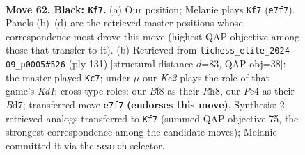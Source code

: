 \documentclass[11pt]{article}
\begin{document}
\begin{figure}[p]\centering
\begin{subfigure}{0.46\textwidth}\centering
\resizebox{\linewidth}{!}{%
\newchessgame
\chessboard[
  setfen={4rb2/4k1p1/p1p4r/Pp1b1p1p/2p2P1P/2B1P1P1/1P1K3N/1R4R1 b - - 26 62},
  showmover=false,
  pgfstyle=straightmove, color=movearrow, markmove={e7-f7}
]}
\caption{}
\end{subfigure}\hfill
\begin{subfigure}{0.46\textwidth}\centering
\resizebox{\linewidth}{!}{%
\newchessgame
\chessboard[
  setfen={2rk3r/3b1p2/4p1p1/1p1pP2p/pP3P2/P1P1K1P1/2R1B2P/3R4 b - - 72 66},
  showmover=false,
  pgfstyle=straightmove, color=movearrow, markmove={d8-c7}
]}
\caption{}
\end{subfigure}
\\[4pt]

\caption{\textbf{Move 62, Black: \texttt{Kf7}.} (a) Our position; Melanie plays \texttt{Kf7} (\texttt{e7f7}). Panels (b)--(d) are the retrieved master positions whose correspondence most drove this move (highest QAP objective among those that transfer to it). (b) Retrieved from \texttt{lichess\_elite\_2024-09\_p0005\#526} (ply 131) [structural distance $d$=83, QAP obj=38]: the master played \texttt{Kc7}; under $\mu$ our \emph{Ke2} plays the role of that game's \emph{Kd1}; cross-type roles: our \emph{B}f8 as their \emph{R}h8, our \emph{P}c4 as their \emph{B}d7; transferred move \texttt{e7f7} \textbf{(endorses this move)}. Synthesis: 2 retrieved analogs transferred to \texttt{Kf7} (summed QAP objective 75, the strongest correspondence among the candidate moves); Melanie committed it via the \texttt{search} selector.}
\label{fig:thought-m123}
\end{figure}

\clearpage
\end{document}
